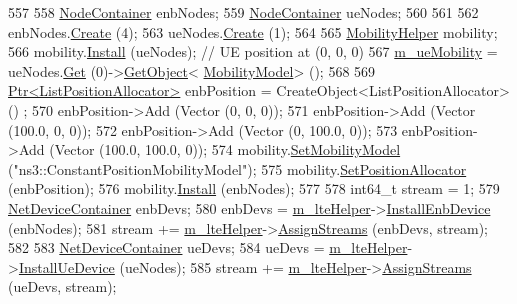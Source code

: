 \begin{DoxyCode}
557 
558   \hyperlink{classns3_1_1NodeContainer}{NodeContainer} enbNodes;
559   \hyperlink{classns3_1_1NodeContainer}{NodeContainer} ueNodes;
560 
561 
562   enbNodes.\hyperlink{classns3_1_1NodeContainer_a787f059e2813e8b951cc6914d11dfe69}{Create} (4);
563   ueNodes.\hyperlink{classns3_1_1NodeContainer_a787f059e2813e8b951cc6914d11dfe69}{Create} (1);
564 
565   \hyperlink{classns3_1_1MobilityHelper}{MobilityHelper} mobility;
566   mobility.\hyperlink{classns3_1_1MobilityHelper_a07737960ee95c0777109cf2994dd97ae}{Install} (ueNodes); \textcolor{comment}{// UE position at (0, 0, 0)}
567   \hyperlink{classLteRrcConnectionEstablishmentErrorTestCase_ae4cadd3c64d09eec2a511495dcc89095}{m\_ueMobility} = ueNodes.\hyperlink{classns3_1_1NodeContainer_a9ed96e2ecc22e0f5a3d4842eb9bf90bf}{Get} (0)->\hyperlink{classns3_1_1Object_a13e18c00017096c8381eb651d5bd0783}{GetObject}<
      \hyperlink{classns3_1_1MobilityModel}{MobilityModel}> ();
568 
569   \hyperlink{classns3_1_1Ptr}{Ptr<ListPositionAllocator>} enbPosition = CreateObject<ListPositionAllocator> ()
      ;
570   enbPosition->Add (Vector (0, 0, 0));
571   enbPosition->Add (Vector (100.0, 0, 0));
572   enbPosition->Add (Vector (0, 100.0, 0));
573   enbPosition->Add (Vector (100.0, 100.0, 0));
574   mobility.\hyperlink{classns3_1_1MobilityHelper_a030275011b6f40682e70534d30280aba}{SetMobilityModel} (\textcolor{stringliteral}{"ns3::ConstantPositionMobilityModel"});
575   mobility.\hyperlink{classns3_1_1MobilityHelper_ac59d5295076be3cc11021566713a28c5}{SetPositionAllocator} (enbPosition);
576   mobility.\hyperlink{classns3_1_1MobilityHelper_a07737960ee95c0777109cf2994dd97ae}{Install} (enbNodes);
577 
578   int64\_t stream = 1;
579   \hyperlink{classns3_1_1NetDeviceContainer}{NetDeviceContainer} enbDevs;
580   enbDevs = \hyperlink{classLteRrcConnectionEstablishmentTestCase_a8b3adef98e6fbb2d1a88c98aba524a4e}{m\_lteHelper}->\hyperlink{classns3_1_1LteHelper_a5e009ad35ef85f46b5a6099263f15a03}{InstallEnbDevice} (enbNodes);
581   stream += \hyperlink{classLteRrcConnectionEstablishmentTestCase_a8b3adef98e6fbb2d1a88c98aba524a4e}{m\_lteHelper}->\hyperlink{classns3_1_1LteHelper_ae90d941582aa49a1b28c9301ece35b07}{AssignStreams} (enbDevs, stream);
582 
583   \hyperlink{classns3_1_1NetDeviceContainer}{NetDeviceContainer} ueDevs;
584   ueDevs = \hyperlink{classLteRrcConnectionEstablishmentTestCase_a8b3adef98e6fbb2d1a88c98aba524a4e}{m\_lteHelper}->\hyperlink{classns3_1_1LteHelper_ac9cd932d7de92811cfa953c2e3b2fc9f}{InstallUeDevice} (ueNodes);
585   stream += \hyperlink{classLteRrcConnectionEstablishmentTestCase_a8b3adef98e6fbb2d1a88c98aba524a4e}{m\_lteHelper}->\hyperlink{classns3_1_1LteHelper_ae90d941582aa49a1b28c9301ece35b07}{AssignStreams} (ueDevs, stream);

\end{DoxyCode}
